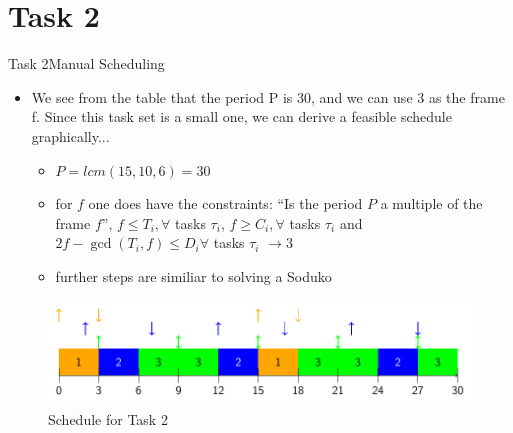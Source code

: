 
\section{Task 2}

\setcounter{task}{1}

\begin{frame}[allowframebreaks]{Task 2}{Manual Scheduling\vspace{0.5cm}}
  \begin{itemize}
    \item We see from the table that the period P is 30, and we can use 3 as the frame f. Since this task set is a small one, we can derive a feasible schedule graphically...
      \begin{itemize}
        \item $P = lcm(15, 10, 6) = 30$
        \item for $f$ one does have the \alert{constraints}: \enquote{Is the period $P$ a multiple of the frame $f$}, $f \leq T_i, \forall$ tasks $\tau_i$, $f \geq C_i, \forall$ tasks $\tau_i$ and $2 f-\operatorname{gcd}\left(T_i, f\right) \leq D_i \forall$ tasks $\tau_i$ $\rightarrow 3$
        \item further steps are similiar to solving a \alert{Soduko}
      \end{itemize}
  \end{itemize}
  \begin{figure}
    \includegraphics[width=0.7\paperwidth]{./figures/task2_schedule.png}
    \caption{Schedule for Task 2}
  \end{figure}
\end{frame}
